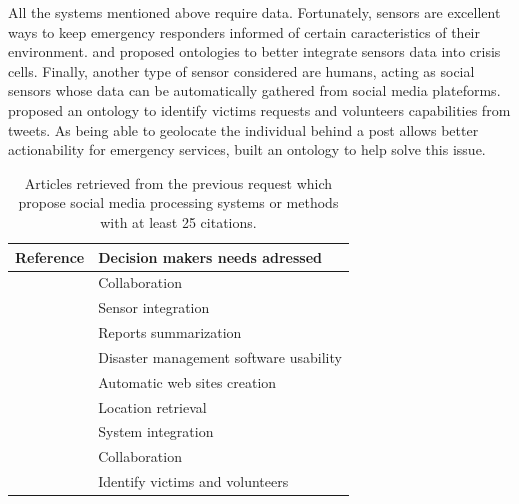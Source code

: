 All the systems mentioned above require data.
Fortunately, sensors are excellent ways to keep emergency responders informed of certain caracteristics of their environment.
\cite{posladSemanticIoTEarly2015} and \cite{babitskiOntologybasedIntegrationSensor2009} proposed ontologies to better integrate sensors data into crisis cells.
Finally, another type of sensor considered are humans, acting as social sensors whose data can be automatically gathered from social media plateforms.
\cite{purohitIdentifyingSeekersSuppliers2014} proposed an ontology to identify victims requests and volunteers capabilities from tweets.
As being able to geolocate the individual behind a post allows better actionability for emergency services, \cite{ghahremanlouGeotaggingTwitterMessages2014} built an ontology to help solve this issue.

\begin{table}[bp]
    \centering
    \renewcommand{\arraystretch}{1.5}
    \caption{Articles retrieved from the previous request which propose social media processing systems or methods with at least 25 citations.}
    \begin{tabular}{m{} m{}}
        Reference                                               & Decision makers needs adressed         \\ [0.5ex]
        \toprule
        \cite{benabenMetamodelItsOntology2008b}                 & Collaboration                          \\
        \cite{babitskiOntologybasedIntegrationSensor2009}       & Sensor integration                     \\
        \cite{liOntologyenrichedMultiDocumentSummarization2010} & Reports summarization                  \\
        \cite{babitskiSoKNOSUsingSemantic2011}                  & Disaster management software usability \\
        \cite{chouOntologyDevelopingWeb2011}                    & Automatic web sites creation           \\
        \cite{ghahremanlouGeotaggingTwitterMessages2014}        & Location retrieval                     \\
        \cite{madniSystemsIntegrationKey2014}                   & System integration                     \\
        \cite{othmanDevelopmentValidationDisaster2014b}         & Collaboration                          \\
        \cite{purohitIdentifyingSeekersSuppliers2014}           & Identify victims and volunteers        \\

\end{tabular}
\end{table}
